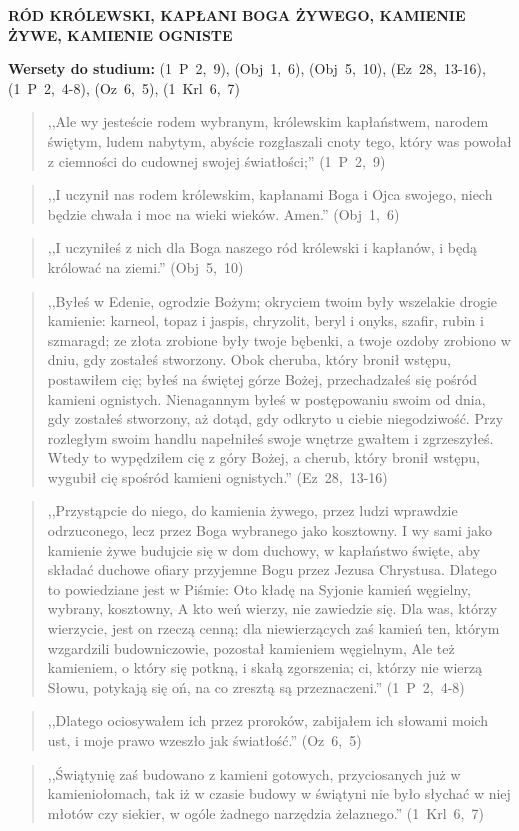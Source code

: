 \documentclass[10pt,a4paper,oneside]{article}
\begin{document}
\centerline{\textbf{\MakeUppercase{Ród Królewski, Kapłani Boga Żywego, Kamienie Żywe, Kamienie Ogniste}}}
\begin{center}
\textbf{Wersety do studium:} (1~P~2,~9), (Obj~1,~6), (Obj~5,~10), (Ez~28,~13-16), (1~P~2,~4-8), (Oz~6,~5), (1~Krl~6,~7)
\end{center}
\begin{quote}
,,Ale wy jesteście rodem wybranym, królewskim kapłaństwem, narodem świętym, ludem nabytym, abyście rozgłaszali cnoty tego, który was powołał z ciemności do cudownej swojej światłości;'' (1~P~2,~9)
\end{quote}
\begin{quote}
,,I uczynił nas rodem królewskim, kapłanami Boga i Ojca swojego, niech będzie chwała i moc na wieki wieków. Amen.'' (Obj~1,~6)
\end{quote}
\begin{quote}
,,I uczyniłeś z nich dla Boga naszego ród królewski i kapłanów, i będą królować na ziemi.'' (Obj~5,~10)
\end{quote}
\begin{quote}
,,Byłeś w Edenie, ogrodzie Bożym; okryciem twoim były wszelakie drogie kamienie: karneol, topaz i jaspis, chryzolit, beryl i onyks, szafir, rubin i szmaragd; ze złota zrobione były twoje bębenki, a twoje ozdoby zrobiono w dniu, gdy zostałeś stworzony. Obok cheruba, który bronił wstępu, postawiłem cię; byłeś na świętej górze Bożej, przechadzałeś się pośród kamieni ognistych. Nienagannym byłeś w postępowaniu swoim od dnia, gdy zostałeś stworzony, aż dotąd, gdy odkryto u ciebie niegodziwość. Przy rozległym swoim handlu napełniłeś swoje wnętrze gwałtem i zgrzeszyłeś. Wtedy to wypędziłem cię z góry Bożej, a cherub, który bronił wstępu, wygubił cię spośród kamieni ognistych.'' (Ez~28,~13-16)
\end{quote}
\begin{quote}
,,Przystąpcie do niego, do kamienia żywego, przez ludzi wprawdzie odrzuconego, lecz przez Boga wybranego jako kosztowny. I wy sami jako kamienie żywe budujcie się w dom duchowy, w kapłaństwo święte, aby składać duchowe ofiary przyjemne Bogu przez Jezusa Chrystusa. Dlatego to powiedziane jest w Piśmie: Oto kładę na Syjonie kamień węgielny, wybrany, kosztowny, A kto weń wierzy, nie zawiedzie się. Dla was, którzy wierzycie, jest on rzeczą cenną; dla niewierzących zaś kamień ten, którym wzgardzili budowniczowie, pozostał kamieniem węgielnym, Ale też kamieniem, o który się potkną, i skałą zgorszenia; ci, którzy nie wierzą Słowu, potykają się oń, na co zresztą są przeznaczeni.'' (1~P~2,~4-8)
\end{quote}
\begin{quote}
,,Dlatego ociosywałem ich przez proroków, zabijałem ich słowami moich ust, i moje prawo wzeszło jak światłość.'' (Oz~6,~5)
\end{quote}
\begin{quote}
,,Świątynię zaś budowano z kamieni gotowych, przyciosanych już w kamieniołomach, tak iż w czasie budowy w świątyni nie było słychać w niej młotów czy siekier, w ogóle żadnego narzędzia żelaznego.'' (1~Krl~6,~7)
\end{quote}
\end{document}
